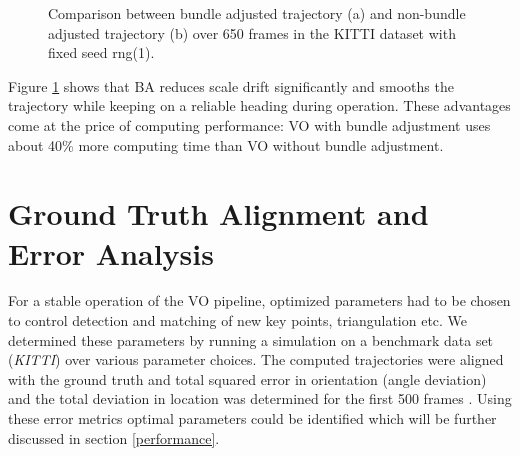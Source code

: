 \begin{figure}[htp]
	\centering
	
	\hspace{2cm}
	\caption{Comparison between bundle adjusted trajectory (a) and non-bundle adjusted trajectory (b) over 650 frames in the KITTI dataset with fixed seed rng(1).}
	\label{fig:BAeffect}
\end{figure}


Figure \ref{fig:BAeffect} shows that BA reduces scale drift significantly and smooths the trajectory while keeping on a reliable heading during operation. These advantages come at the price of computing performance: VO with bundle adjustment uses about 40\% more computing time than VO without bundle adjustment.

\section{Ground Truth Alignment and Error Analysis}
\label{simulation}

For a stable operation of the VO pipeline, optimized parameters had to be chosen to control detection and matching of new key points, triangulation etc. 
We determined these parameters by running a simulation  on a benchmark data set (\emph{KITTI}) over various parameter choices. The computed trajectories were aligned with the ground truth and total squared error in orientation (angle deviation) and the total deviation in location was determined for the first 500 frames . Using these error metrics optimal parameters could be identified which will be further discussed in section \ref{performance}.